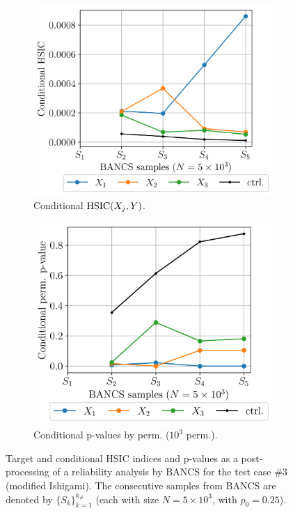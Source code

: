 \begin{figure}
\begin{subfigure}[b]{0.48\linewidth}
    \end{subfigure}
    \\[20pt]
    \begin{subfigure}[b]{0.48\linewidth}
        \centering
        \includegraphics[width=\linewidth]{part3/figures/BANCS/ishigami_CHSIC.png}
        \caption{Conditional $\mathrm{HSIC}(X_j, Y)$.}
    \end{subfigure}
    \begin{subfigure}[b]{0.48\linewidth}
        \centering
        \includegraphics[width=\linewidth]{part3/figures/BANCS/ishigami_Cpvalue_permutation.png}
        \caption{Conditional p-values by perm. ($10^3$ perm.).}
    \end{subfigure}
    \caption{Target and conditional HSIC indices and p-values as a post-processing of a reliability analysis by BANCS for the test case \#3 (modified Ishigami). 
                The consecutive samples from BANCS are denoted by $\{S_k\}_{k=1}^{k_\#}$ (each with size $N=5\times10^3$, with $p_0=0.25$).}
    \label{fig:rosa_ishigami}
\end{figure}


